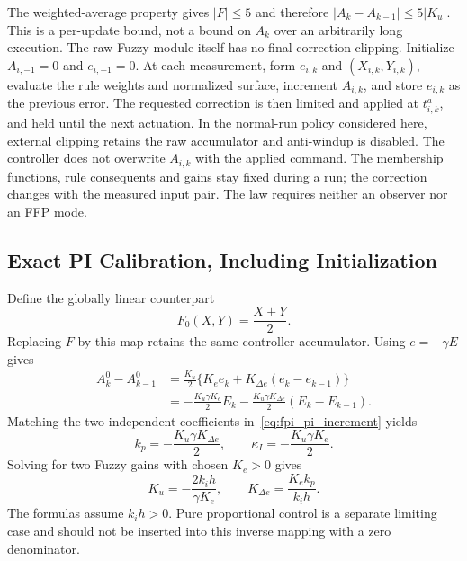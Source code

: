 The weighted-average property gives $|F|\le5$ and therefore
$|A_k-A_{k-1}|\le5|K_u|$. This is a per-update bound, not a bound on $A_k$
over an arbitrarily long execution. The raw Fuzzy module itself has no
final correction clipping.
Initialize $A_{i,-1}=0$ and $e_{i,-1}=0$. At each measurement, form
$e_{i,k}$ and $(X_{i,k},Y_{i,k})$, evaluate the rule weights and normalized
surface, increment $A_{i,k}$, and store $e_{i,k}$ as the previous error.
The requested correction is then limited and applied at $t^a_{i,k}$, and
held until the next actuation. In the normal-run policy considered here,
external clipping retains the raw accumulator and anti-windup is disabled.
The controller does not overwrite $A_{i,k}$ with the applied command.
The membership functions, rule consequents and gains stay fixed during a
run; the correction changes with the measured input pair. The law requires
neither an observer nor an FFP mode.


\subsection{Exact PI Calibration, Including Initialization}
\label{subsec:fpi_calibration}

Define the globally linear counterpart
\begin{equation}
 F_0(X,Y)=\frac{X+Y}{2}.
 \label{eq:fpi_f0}
\end{equation}
Replacing $F$ by this map retains the same controller accumulator.
Using $e=-\gamma E$ gives
\begin{align}
 A^0_k-A^0_{k-1}
 &=\frac{K_u}{2}\{K_e e_k+K_{\Delta e}(e_k-e_{k-1})\}\\
 &=-\frac{K_u\gamma K_e}{2}E_k
   -\frac{K_u\gamma K_{\Delta e}}2(E_k-E_{k-1}).
 \label{eq:fpi_substitution}
\end{align}
Matching the two independent coefficients in~\eqref{eq:fpi_pi_increment}
yields
\begin{equation}
 k_p=-\frac{K_u\gamma K_{\Delta e}}2,\qquad
 \kappa_I=-\frac{K_u\gamma K_e}2.
 \label{eq:fpi_matching}
\end{equation}
Solving for two Fuzzy gains with chosen $K_e>0$ gives
\begin{equation}
 K_u=-\frac{2k_ih}{\gamma K_e},\qquad
 K_{\Delta e}=\frac{K_ek_p}{k_ih}.
 \label{eq:fpi_design_gains}
\end{equation}
The formulas assume $k_i h>0$. Pure proportional control is a separate
limiting case and should not be inserted into this inverse mapping with
a zero denominator.

